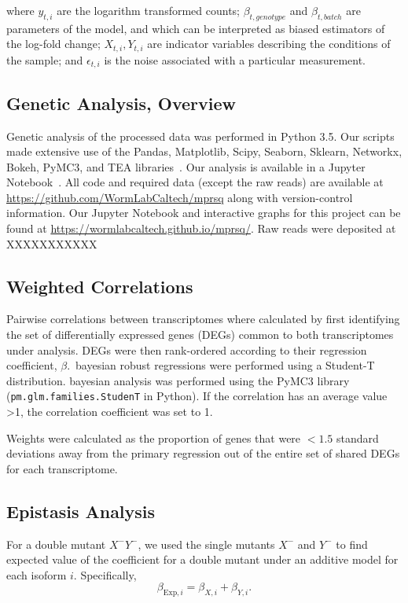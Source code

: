 \documentclass[9pt,twocolumn,twoside]{pnas-new}
\begin{document}
{where $y_{t, i}$ are the logarithm transformed counts; $\beta_{t, genotype}$ and
$\beta_{t, batch}$ are parameters of the model, and which can be interpreted as
biased estimators of the log-fold change; $X_{t, i}, Y_{t, i}$ are indicator
variables describing the conditions of the sample; and $\epsilon_{t, i}$ is the
noise associated with a particular measurement.

\subsection*{Genetic Analysis, Overview}
Genetic analysis of the processed data was performed in Python 3.5. Our scripts
made extensive use of the Pandas, Matplotlib, Scipy, Seaborn, Sklearn, Networkx,
Bokeh, PyMC3, and TEA libraries~\cite{Team2014,McKinney2011,Oliphant2007,
Pedregosa2012,Salvatier2015,VanDerWalt2011,Hunter2007,Angeles-Albores2016,Waskom}.
Our analysis is available in a Jupyter Notebook~\cite{Perez2007}. All code and
required data (except the raw reads) are available at
\url{https://github.com/WormLabCaltech/mprsq} along with version-control
information. Our Jupyter Notebook and interactive graphs for this project can be
found at \url{https://wormlabcaltech.github.io/mprsq/}. Raw reads were deposited
at XXXXXXXXXXX


\subsection*{Weighted Correlations}
Pairwise correlations between transcriptomes where calculated by first identifying
the set of differentially expressed genes (DEGs) common to both transcriptomes under
analysis. DEGs were then rank-ordered according to their regression coefficient,
$\beta$.\ bayesian robust regressions were performed using a Student-T distribution.
bayesian analysis was performed using the PyMC3 library~\cite{Salvatier2015}
(\texttt{pm.glm.families.StudenT} in Python). If the correlation has an average
value >1, the correlation coefficient was set to 1.

Weights were calculated as the proportion of genes that were $<1.5$ standard deviations
away from the primary regression out of the entire set of shared DEGs for each
transcriptome.

\subsection*{Epistasis Analysis}
For a double mutant $X^-Y^-$, we used the single mutants $X^-$ and $Y^-$ to
find expected value of the coefficient for a double mutant under an additive model
for each isoform $i$.
Specifically,
\begin{equation}
  \beta_{\mathrm{Exp},i} = \beta_{X,i} + \beta_{Y,i}.
\end{equation}

}
\end{document}
